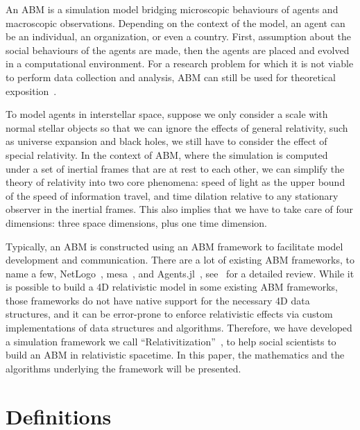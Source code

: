 \documentclass{svproc}
\begin{document}
An ABM is a simulation model bridging microscopic behaviours of agents and macroscopic observations.
Depending on the context of the model, an agent can be an individual, an organization, or even a country.
First, assumption about the social behaviours of the agents are made, then the agents are placed and evolved
in a computational environment.
For a research problem for which it is not viable to perform data collection and analysis,
ABM can still be used for theoretical exposition~\cite{edmonds2015simulating}.

To model agents in interstellar space, suppose we only consider a scale with normal stellar objects
so that we can ignore the effects of general relativity, such as universe expansion and black holes,
we still have to consider the effect of special relativity.
In the context of ABM, where the simulation is computed under a set of inertial frames that are at rest to each other,
we can simplify the theory of relativity into two core
phenomena: speed of light as the upper bound of the speed of information travel, and
time dilation relative to any stationary observer in the inertial frames.
This also implies that we have to take care of four dimensions: three space dimensions, plus one time dimension.

Typically, an ABM is constructed using an ABM framework to facilitate model development and communication.
There are a lot of existing ABM frameworks, to name a few, NetLogo~\cite{netlogo}, mesa~\cite{python-mesa-2020},
and Agents.jl~\cite{Agents2021}, see~\cite{pal2020review} for a detailed review.
While it is possible to build a 4D relativistic model in some existing ABM frameworks, 
those frameworks do not have native support for the necessary 4D data structures,
and it can be error-prone to enforce relativistic effects via custom implementations of data structures and algorithms.
Therefore, we have developed a simulation framework we call ``Relativitization''~\cite{relativitization},
to help social scientists to build an ABM in relativistic spacetime.
In this paper, the mathematics and the algorithms underlying the framework will be presented.

\section{Definitions}
\end{document}
